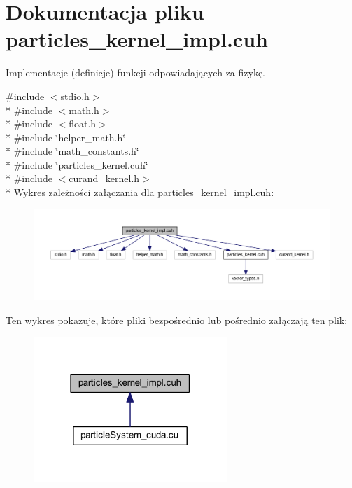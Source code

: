 \hypertarget{particles__kernel__impl_8cuh}{\section{Dokumentacja pliku particles\-\_\-kernel\-\_\-impl.\-cuh}
\label{particles__kernel__impl_8cuh}
}


Implementacje (definicje) funkcji odpowiadających za fizykę.  


{\ttfamily \#include $<$stdio.\-h$>$}\\*
{\ttfamily \#include $<$math.\-h$>$}\\*
{\ttfamily \#include $<$float.\-h$>$}\\*
{\ttfamily \#include \char`\"{}helper\-\_\-math.\-h\char`\"{}}\\*
{\ttfamily \#include \char`\"{}math\-\_\-constants.\-h\char`\"{}}\\*
{\ttfamily \#include \char`\"{}particles\-\_\-kernel.\-cuh\char`\"{}}\\*
{\ttfamily \#include $<$curand\-\_\-kernel.\-h$>$}\\*
Wykres zależności załączania dla particles\-\_\-kernel\-\_\-impl.\-cuh\-:\nopagebreak
\begin{figure}[H]
\begin{center}
\leavevmode
\includegraphics[width=350pt]{particles__kernel__impl_8cuh__incl}
\end{center}
\end{figure}
Ten wykres pokazuje, które pliki bezpośrednio lub pośrednio załączają ten plik\-:\nopagebreak
\begin{figure}[H]
\begin{center}
\leavevmode
\includegraphics[width=207pt]{particles__kernel__impl_8cuh__dep__incl}
\end{center}
\end{figure}
